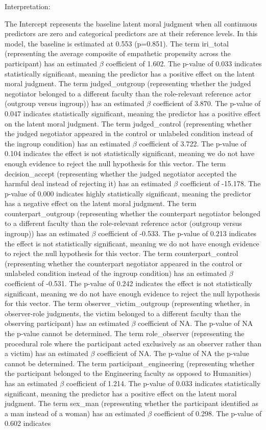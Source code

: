 \documentclass[11pt]{article}
\begin{document}
Interpretation:

The Intercept represents the baseline latent moral judgment when all continuous predictors are zero and categorical predictors are at their reference levels. In this model, the baseline is estimated at 0.553 (p=0.851). The term iri\_total (representing the average composite of empathetic propensity across the participant) has an estimated $\beta$ coefficient of 1.602. The p-value of 0.033 indicates statistically significant, meaning the predictor has a positive effect on the latent moral judgment. The term judged\_outgroup (representing whether the judged negotiator belonged to a different faculty than the role-relevant reference actor (outgroup versus ingroup)) has an estimated $\beta$ coefficient of 3.870. The p-value of 0.047 indicates statistically significant, meaning the predictor has a positive effect on the latent moral judgment. The term judged\_control (representing whether the judged negotiator appeared in the control or unlabeled condition instead of the ingroup condition) has an estimated $\beta$ coefficient of 3.722. The p-value of 0.104 indicates the effect is not statistically significant, meaning we do not have enough evidence to reject the null hypothesis for this vector. The term decision\_accept (representing whether the judged negotiator accepted the harmful deal instead of rejecting it) has an estimated $\beta$ coefficient of -15.178. The p-value of 0.000 indicates highly statistically significant, meaning the predictor has a negative effect on the latent moral judgment. The term counterpart\_outgroup (representing whether the counterpart negotiator belonged to a different faculty than the role-relevant reference actor (outgroup versus ingroup)) has an estimated $\beta$ coefficient of -0.533. The p-value of 0.213 indicates the effect is not statistically significant, meaning we do not have enough evidence to reject the null hypothesis for this vector. The term counterpart\_control (representing whether the counterpart negotiator appeared in the control or unlabeled condition instead of the ingroup condition) has an estimated $\beta$ coefficient of -0.531. The p-value of 0.242 indicates the effect is not statistically significant, meaning we do not have enough evidence to reject the null hypothesis for this vector. The term observer\_victim\_outgroup (representing whether, in observer-role judgments, the victim belonged to a different faculty than the observing participant) has an estimated $\beta$ coefficient of NA. The p-value of NA the p-value cannot be determined. The term role\_observer (representing the procedural role where the participant acted exclusively as an observer rather than a victim) has an estimated $\beta$ coefficient of NA. The p-value of NA the p-value cannot be determined. The term participant\_engineering (representing whether the participant belonged to the Engineering faculty as opposed to Humanities) has an estimated $\beta$ coefficient of 1.214. The p-value of 0.033 indicates statistically significant, meaning the predictor has a positive effect on the latent moral judgment. The term sex\_man (representing whether the participant identified as a man instead of a woman) has an estimated $\beta$ coefficient of 0.298. The p-value of 0.602 indicates 
\end{document}
